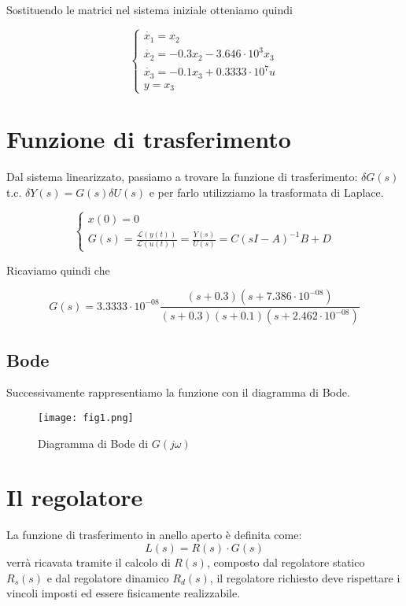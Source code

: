 \documentclass{article}
\begin{document}
Sostituendo le matrici nel sistema iniziale otteniamo quindi
\begin{large}
\[
\begin{cases}
\dot{x_1}=x_2\\
\dot{x_2}=-0.3x_2-3.646\cdot10^3 x_3\\
\dot{x_3}=-0.1 x_3+0.3333\cdot10^7 u\\
y=x_3
\end{cases}
\]
\end{large}

\section{Funzione di trasferimento}
Dal sistema linearizzato, passiamo a trovare la funzione di trasferimento: $\delta G(s)$ t.c. $\delta{Y} (s) = G(s)\delta{U} (s)$ e per farlo utilizziamo la trasformata di Laplace.

\begin{large}
\[
\begin{cases}
x(0)=0 \\
G(s)=\frac{\mathcal{L}(y(t))}{\mathcal{L}(u(t))}=\frac{Y(s)}{U(s)}=C(sI-A)^{-1} B +D
\end{cases}
\]
\end{large}

Ricaviamo quindi che
\begin{large}
\[
G(s) = 3.3333\cdot 10^{-08}\frac{(s+0.3) (s+7.386\cdot 10^{-08})} {(s+0.3) (s+0.1) (s+2.462\cdot 10^{-08})}
\]
\end{large}



\subsection{Bode}

Successivamente rappresentiamo la funzione con il diagramma di Bode.

\begin{figure}[!h]
\centering
\texttt{[image: fig1.png]}
\caption{\label{fig:bode}Diagramma di Bode di $G(j\omega)$}
\end{figure}
\pagebreak

\section{Il regolatore}
La funzione di trasferimento in anello aperto è definita come:
\[ L(s) = R(s) \cdot G(s)  \]
verrà ricavata tramite il calcolo di $R(s)$, composto dal regolatore statico $R_s(s)$ e dal regolatore dinamico $R_d(s)$, il regolatore richiesto deve rispettare i vincoli imposti ed essere fisicamente realizzabile.
\end{document}
